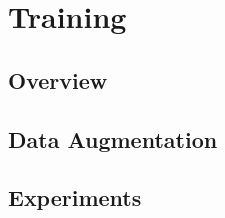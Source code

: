 \chapter{Training}
\label{Training}

\section{Overview}
\section{Data Augmentation}
\section{Experiments}

